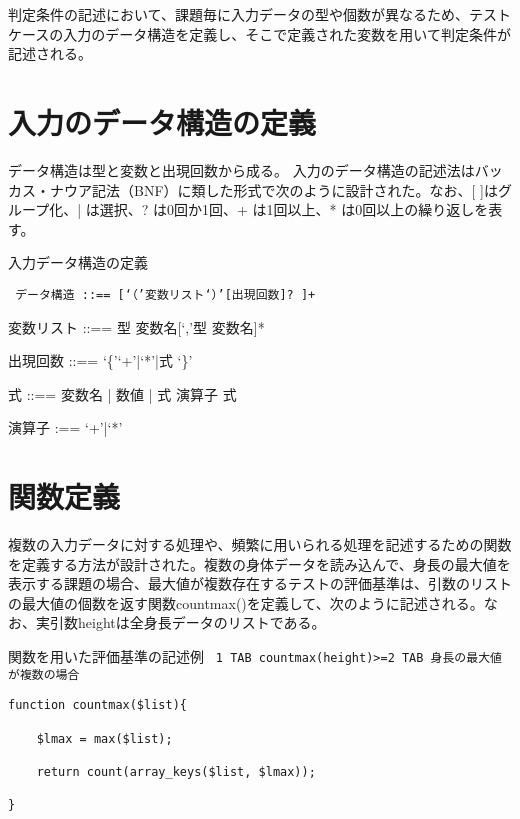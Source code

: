 \documentclass{tpu-sotu}
\begin{document}
判定条件の記述において、課題毎に入力データの型や個数が異なるため、テストケースの入力のデータ構造を定義し、そこで定義された変数を用いて判定条件が記述される。
\section{入力のデータ構造の定義}
データ構造は型と変数と出現回数から成る。
入力のデータ構造の記述法はバッカス・ナウア記法（BNF）に類した形式で次のように設計された。なお、[ ]はグループ化、| は選択、? は0回か1回、+ は1回以上、* は0回以上の繰り返しを表す。

\begin{minipage}[b]{.7\textwidth}
\begin{itembox}[l]{入力データ構造の定義}
{\tt
データ構造 ::== [‘（’変数リスト‘）’[出現回数]? ]+

変数リスト ::== 型 変数名[‘,’型 変数名]*

出現回数 ::== ‘\{’‘+’|‘*’|式 ‘\}’

式 ::== 変数名 | 数値 | 式 演算子 式

演算子 :== ‘+’|‘*’
}
\end{itembox}
\end{minipage}

\section{関数定義}
複数の入力データに対する処理や、頻繁に用いられる処理を記述するための関数を定義する方法が設計された。複数の身体データを読み込んで、身長の最大値を表示する課題の場合、最大値が複数存在するテストの評価基準は、引数のリストの最大値の個数を返す関数countmax()を定義して、次のように記述される。なお、実引数heightは全身長データのリストである。

\begin{minipage}[b]{.8\textwidth}
\begin{itembox}[l]{関数を用いた評価基準の記述例}
{\tt
1 TAB countmax(height)>=2 TAB 身長の最大値が複数の場合
}
\end{itembox}
\end{minipage}
\begin{lstlisting}[caption = countmax 関数, basicstyle=\ttfamily\footnotesize, frame=single]
function countmax($list){

	$lmax = max($list);

	return count(array_keys($list, $lmax));

}
\end{lstlisting}
\end{document}
